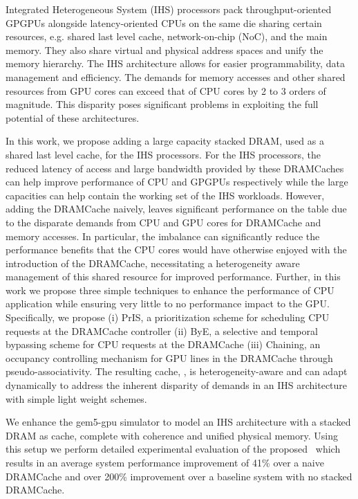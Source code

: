 \par Integrated Heterogeneous System (IHS) processors pack throughput-oriented GPGPUs alongside latency-oriented CPUs on the same die sharing certain resources, e.g. shared last level cache, network-on-chip (NoC), and the main memory. They also share virtual and physical address spaces and unify the memory hierarchy. The IHS architecture allows for easier programmability, data management and efficiency. The demands for memory accesses and other shared resources from GPU cores can exceed that of CPU cores by 2 to 3 orders of magnitude. This disparity poses significant problems in exploiting the full potential of these architectures.
\par In this work, we propose adding a large capacity stacked DRAM, used as a shared last level cache, for the IHS processors. For the IHS processors, the reduced latency of access and large bandwidth provided by these DRAMCaches can help improve performance of CPU and GPGPUs respectively while the large capacities can help contain the working set of the IHS workloads. However, adding the DRAMCache naively, leaves significant performance on the table due to the disparate demands from CPU and GPU cores for DRAMCache and memory accesses. In particular, the imbalance can significantly reduce the performance benefits that the CPU cores would have otherwise enjoyed with the introduction of the DRAMCache, necessitating a heterogeneity aware management of this shared resource for improved performance. Further, in this work we propose three simple techniques to enhance the performance of CPU application while ensuring very little to no performance impact to the GPU. Specifically, we propose (i) PrIS, a prioritization scheme for scheduling CPU
requests at the DRAMCache controller (ii) ByE, a selective and temporal bypassing scheme for CPU requests at the DRAMCache (iii) Chaining, an occupancy controlling mechanism for GPU lines in the DRAMCache through pseudo-associativity. The resulting cache, \cachename, is heterogeneity-aware and can adapt dynamically to address the inherent disparity of demands in an IHS architecture with simple light weight schemes. 
\par We enhance the gem5-gpu simulator to model an IHS architecture with a stacked DRAM as cache, complete with coherence and unified physical memory. Using this setup we perform detailed experimental evaluation of the proposed \cachename\ which results in an average system performance improvement of 41\% over a naive DRAMCache and over 200\% improvement over a baseline system with no stacked DRAMCache.
